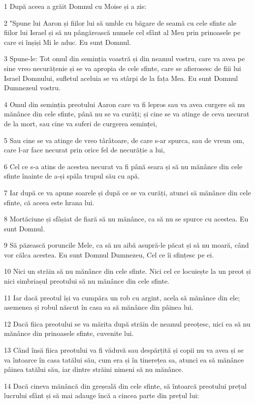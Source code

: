 \par 1 După aceea a grăit Domnul cu Moise și a zis:
\par 2 "Spune lui Aaron și fiilor lui să umble cu băgare de seamă cu cele sfinte ale fiilor lui Israel și să nu pângărească numele cel sfânt al Meu prin prinoasele pe care ei înșiși Mi le aduc. Eu sunt Domnul.
\par 3 Spune-le: Tot omul din seminția voastră și din neamul vostru, care va avea pe sine vreo necurățenie și se va apropia de cele sfinte, care se afierosesc de fiii lui Israel Domnului, sufletul aceluia se va stârpi de la fața Mea. Eu sunt Domnul Dumnezeul vostru.
\par 4 Omul din seminția preotului Aaron care va fi lepros sau va avea curgere să nu mănânce din cele sfinte, până nu se va curăți; și cine se va atinge de ceva necurat de la mort, sau cine va suferi de curgerea seminței,
\par 5 Sau cine se va atinge de vreo târâtoare, de care s-ar spurca, sau de vreun om, care l-ar face necurat prin orice fel de necurăție a lui,
\par 6 Cel ce s-a atins de acestea necurat va fi până seara și să nu mănânce din cele sfinte înainte de a-și spăla trupul său cu apă.
\par 7 Iar după ce va apune soarele și după ce se va curăți, atunci să mănânce din cele sfinte, că aceea este hrana lui.
\par 8 Mortăciune și sfâșiat de fiară să nu mănânce, ca să nu se spurce cu acestea. Eu sunt Domnul.
\par 9 Să păzească poruncile Mele, ca să nu aibă asupră-le păcat și să nu moară, când vor călca acestea. Eu sunt Domnul Dumnezeu, Cel ce îi sfințesc pe ei.
\par 10 Nici un străin să nu mănânce din cele sfinte. Nici cel ce locuiește la un preot și nici simbriașul preotului să nu mănânce din cele sfinte.
\par 11 Iar dacă preotul își va cumpăra un rob cu argint, acela să mănânce din ele; asemenea și robul născut în casa sa să mănânce din pâinea lui.
\par 12 Dacă fiica preotului se va mărita după străin de neamul preoțesc, nici ea să nu mănânce din prinoasele sfinte, cuvenite lui.
\par 13 Când însă fiica preotului va fi văduvă sau despărțită și copii nu va avea și se va întoarce în casa tatălui său, cum era și în tinerețea sa, atunci ea să mănânce pâinea tatălui său, iar dintre străini nimeni să nu mănânce.
\par 14 Dacă cineva mănâncă din greșeală din cele sfinte, să întoarcă preotului prețul lucrului sfânt și să mai adauge încă a cincea parte din prețul lui:
